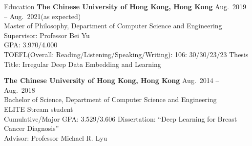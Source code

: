 

\begin{rSection}{Education}
{\bf The Chinese University of Hong Kong, Hong Kong} \hfill {Aug.~2019 -- Aug.~2021(as expected)} \\ 
Master of Philosophy, Department of Computer Science and Engineering \\
Supervisor: Professor Bei Yu \\
GPA: 3.970/4.000 \\
TOEFL(Overall: Reading/Listening/Speaking/Writing): 106: 30/30/23/23
Thesis Title: Irregular Deep Data Embedding and Learning

{\bf The Chinese University of Hong Kong, Hong Kong} \hfill {Aug.~2014 -- Aug.~2018} \\ 
Bachelor of Science, Department of Computer Science and Engineering \\
ELITE Stream student \\
Cumulative/Major GPA: 3.529/3.606
Dissertation: ``Deep Learning for Breast Cancer Diagnosis'' \\ 
Advisor: Professor Michael R. Lyu
\end{rSection}




